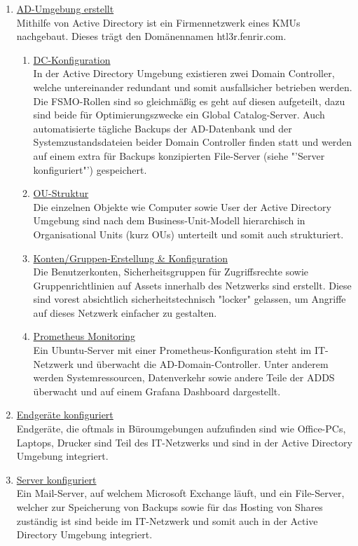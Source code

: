 \documentclass[
	headings=optiontotocandhead,%
	oneside,
	numbers=noenddot,%
	toc=flat, %
	10pt, %
	parskip=full, %
	listof=totoc, %
	listof=flat, %
	numbers=noenddot, %
	bibliography=totoc, %
	a4paper,DIV=14,
]{scrartcl}
\begin{document}
\begin{enumerate}[start=1,label={\bfseries Ziel-H \arabic*},leftmargin=*,wide]
\begin{enumerate}[label=\alph*.]
\item{\underline{AD-Umgebung erstellt}}\\
Mithilfe von Active Directory ist ein Firmennetzwerk eines KMUs nachgebaut. Dieses trägt den Domänennamen htl3r.fenrir.com.

\begin{enumerate}[label=\roman*.]
\item{\underline{DC-Konfiguration}}\\
In der Active Directory Umgebung existieren zwei Domain Controller, welche untereinander redundant und somit ausfallsicher betrieben werden. Die FSMO-Rollen sind so gleichmäßig es geht auf diesen aufgeteilt, dazu sind beide für Optimierungszwecke ein Global Catalog-Server. Auch automatisierte tägliche Backups der AD-Datenbank und der Systemzustandsdateien beider Domain Controller finden statt und werden auf einem extra für Backups konzipierten File-Server (siehe "'Server konfiguriert"') gespeichert.
\item{\underline{OU-Struktur}}\\
Die einzelnen Objekte wie Computer sowie User der Active Directory Umgebung sind nach dem Business-Unit-Modell hierarchisch in Organisational Units (kurz OUs) unterteilt und somit auch strukturiert.
\item{\underline{Konten/Gruppen-Erstellung \& Konfiguration}}\\
Die Benutzerkonten, Sicherheitsgruppen für Zugriffsrechte sowie Gruppenrichtlinien auf Assets innerhalb des Netzwerks sind erstellt. Diese sind vorest absichtlich sicherheitstechnisch "locker" gelassen, um Angriffe auf dieses Netzwerk einfacher zu gestalten.
\item{\underline{Prometheus Monitoring}}\\
Ein Ubuntu-Server mit einer Prometheus-Konfiguration steht im IT-Netzwerk und überwacht die AD-Domain-Controller. Unter anderem werden Systemressourcen, Datenverkehr sowie andere Teile der ADDS überwacht und auf einem Grafana Dashboard dargestellt.
\end{enumerate}

\item{\underline{Endgeräte konfiguriert}}\\
Endgeräte, die oftmals in Büroumgebungen aufzufinden sind wie Office-PCs, Laptops, Drucker sind Teil des IT-Netzwerks und sind in der Active Directory Umgebung integriert.

\item{\underline{Server konfiguriert}}\\
Ein Mail-Server, auf welchem Microsoft Exchange läuft, und ein File-Server, welcher zur Speicherung von Backups sowie für das Hosting von Shares zuständig ist sind beide im IT-Netzwerk und somit auch in der Active Directory Umgebung integriert.


\end{enumerate}
\end{enumerate}
\end{document}
